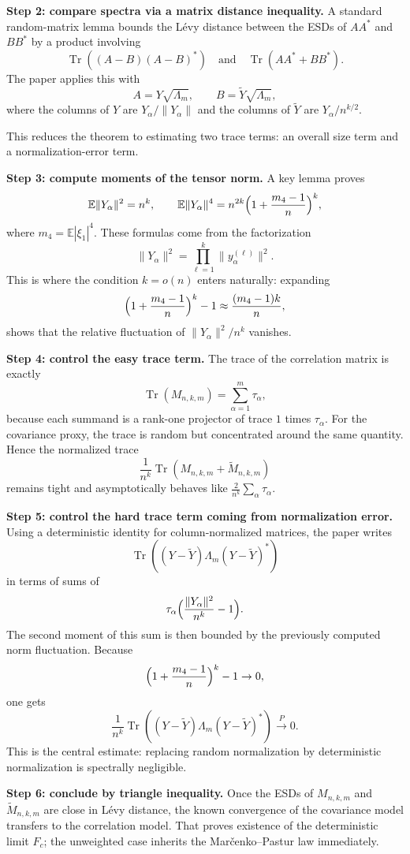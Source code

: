 \documentclass[11pt]{article}
\begin{document}
\textbf{Step 2: compare spectra via a matrix distance inequality.}
A standard random-matrix lemma bounds the L\'evy distance between the ESDs of $AA^*$ and $BB^*$ by a product involving
\[
\operatorname{Tr}((A-B)(A-B)^*) \quad \text{and} \quad \operatorname{Tr}(AA^*+BB^*).
\]
The paper applies this with
\[
A=Y\sqrt{\Lambda_m}, \qquad B=\widetilde Y\sqrt{\Lambda_m},
\]
where the columns of $Y$ are $Y_\alpha/\|Y_\alpha\|$ and the columns of $\widetilde Y$ are $Y_\alpha/n^{k/2}$.

This reduces the theorem to estimating two trace terms: an overall size term and a normalization-error term.

\textbf{Step 3: compute moments of the tensor norm.}
A key lemma proves
\[
\mathbb E\|Y_\alpha\|^2=n^k,
\qquad
\mathbb E\|Y_\alpha\|^4=n^{2k}\Bigl(1+\frac{m_4-1}{n}\Bigr)^k,
\]
where $m_4=\mathbb E|\xi_1|^4$.
These formulas come from the factorization
\[
\|Y_\alpha\|^2 = \prod_{\ell=1}^k \|y_\alpha^{(\ell)}\|^2.
\]
This is where the condition $k=o(n)$ enters naturally: expanding
\[
\Bigl(1+\frac{m_4-1}{n}\Bigr)^k -1
\approx \frac{(m_4-1)k}{n},
\]
shows that the relative fluctuation of $\|Y_\alpha\|^2/n^k$ vanishes.

\textbf{Step 4: control the easy trace term.}
The trace of the correlation matrix is exactly
\[
\operatorname{Tr}(M_{n,k,m})=\sum_{\alpha=1}^m \tau_\alpha,
\]
because each summand is a rank-one projector of trace $1$ times $\tau_\alpha$.
For the covariance proxy, the trace is random but concentrated around the same quantity. Hence the normalized trace
\[
\frac1{n^k}\operatorname{Tr}(M_{n,k,m}+\widetilde M_{n,k,m})
\]
remains tight and asymptotically behaves like $\frac{2}{n^k}\sum_\alpha \tau_\alpha$.

\textbf{Step 5: control the hard trace term coming from normalization error.}
Using a deterministic identity for column-normalized matrices, the paper writes
\[
\operatorname{Tr}((Y-\widetilde Y)\Lambda_m(Y-\widetilde Y)^*)
\]
in terms of sums of
\[
\tau_\alpha\Bigl(\frac{\|Y_\alpha\|^2}{n^k}-1\Bigr).
\]
The second moment of this sum is then bounded by the previously computed norm fluctuation. Because
\[
\Bigl(1+\frac{m_4-1}{n}\Bigr)^k-1 \to 0,
\]
one gets
\[
\frac1{n^k}\operatorname{Tr}((Y-\widetilde Y)\Lambda_m(Y-\widetilde Y)^*) \xrightarrow[]{P} 0.
\]
This is the central estimate: replacing random normalization by deterministic normalization is spectrally negligible.

\textbf{Step 6: conclude by triangle inequality.}
Once the ESDs of $M_{n,k,m}$ and $\widetilde M_{n,k,m}$ are close in L\'evy distance, the known convergence of the covariance model transfers to the correlation model. That proves existence of the deterministic limit $F_c$; the unweighted case inherits the Mar\v cenko--Pastur law immediately.
\end{document}
